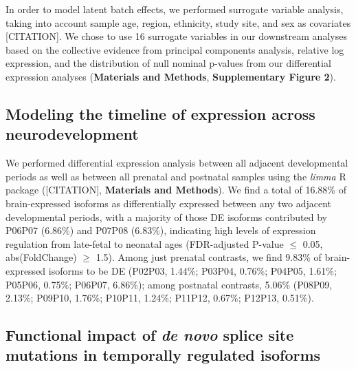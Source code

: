 In order to model latent batch effects, we performed surrogate variable analysis, taking into account sample age, region, ethnicity, study site, and sex as covariates [CITATION]. We chose to use 16 surrogate variables in our downstream analyses based on the collective evidence from principal components analysis, relative log expression, and the distribution of null nominal p-values from our differential expression analyses (\textbf{Materials and Methods}, \textbf{Supplementary Figure 2}). 

\subsection{Modeling the timeline of expression across neurodevelopment}

We performed differential expression analysis between all adjacent developmental periods as well as between all prenatal and postnatal samples using the \textit{limma} R package ([CITATION], \textbf{Materials and Methods}). We find a total of 16.88\% of brain-expressed isoforms as differentially expressed between any two adjacent developmental periods, with a majority of those DE isoforms contributed by P06P07 (6.86\%) and P07P08 (6.83\%), indicating high levels of expression regulation from late-fetal to neonatal ages (FDR-adjusted P-value $\leq$ 0.05, abs(FoldChange) $\geq$ 1.5). Among just prenatal contrasts, we find 9.83\% of brain-expressed isoforms to be DE (P02P03, 1.44\%; P03P04, 0.76\%; P04P05, 1.61\%; P05P06, 0.75\%; P06P07, 6.86\%); among postnatal contrasts, 5.06\% (P08P09, 2.13\%; P09P10, 1.76\%; P10P11, 1.24\%; P11P12, 0.67\%; P12P13, 0.51\%). 

\subsection{Functional impact of \textit{de novo} splice site mutations in temporally regulated isoforms}

